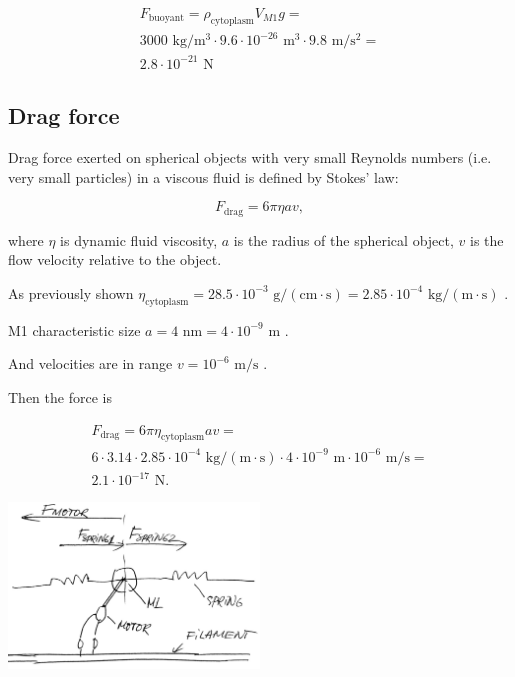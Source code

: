 \begin{equation}
\begin{split}
F_{\text{buoyant}} = \rho_{\text{cytoplasm}}V_{M1}g =\\
3000 \text{ kg}/\text{m}^3 \cdot 9.6 \cdot 10^{-26} \text{ m}^3 \cdot 9.8 \text{ m}/\text{s}^2 =\\
2.8 \cdot 10^{-21} \text{ N}
\end{split}
\end{equation}

\subsection{Drag force}

Drag force exerted on spherical objects with very small Reynolds numbers (i.e. very small particles) in a viscous fluid is defined by Stokes' law:

\begin{equation}
F_{\text{drag}} = 6\pi\eta av,
\end{equation}

where $\eta$ is dynamic fluid viscosity, $a$ is the radius of the spherical object, $v$ is the flow velocity relative to the object.

As previously shown $\eta_{\text{cytoplasm}} = 28.5 \cdot 10^{-3} \text{ g}/(\text{cm} \cdot \text{s}) = 2.85 \cdot 10^{-4} \text{ kg}/(\text{m} \cdot \text{s})$ \cite{swaminathan1997photobleaching, IAPWS2008}.

M1 characteristic size $a = 4 \text{ nm} = 4 \cdot 10^{-9} \text{ m}$ \cite{shtykova2013structural}.

And velocities are in range $v = 10^{-6} \text{ m/s}$ \cite{muller2008tug}.

Then the force is

\begin{equation}
\begin{split}
F_{\text{drag}} = 6\pi\eta_{\text{cytoplasm}} av = \\
6 \cdot 3.14 \cdot 2.85 \cdot 10^{-4} \text{ kg}/(\text{m} \cdot \text{s}) \cdot 4 \cdot 10^{-9} \text{ m} \cdot 10^{-6} \text{ m/s} =\\
2.1 \cdot 10^{-17} \text{ N}.
\end{split}
\end{equation}

\begin{center}
\includegraphics[width=0.5\textwidth]{D_chapters/6_appendix/Capsid.jpg}
\end{center}

